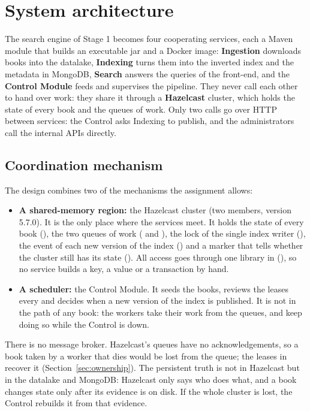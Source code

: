 \section{System architecture}
\label{sec:architecture}

The search engine of Stage 1 becomes four cooperating services, each a Maven module that builds an executable
jar and a Docker image: \textbf{Ingestion} downloads books into the datalake, \textbf{Indexing} turns them into
the inverted index and the metadata in MongoDB, \textbf{Search} answers the queries of the front-end, and the
\textbf{Control Module} feeds and supervises the pipeline. They never call each other to hand over work: they
share it through a \textbf{Hazelcast} cluster, which holds the state of every book and the queues of work. Only two
calls go over HTTP between services: the Control asks Indexing to publish, and the administrators call the
internal APIs directly.

\subsection{Coordination mechanism}

The design combines two of the mechanisms the assignment allows:

\begin{itemize}
  \item \textbf{A shared-memory region:} the Hazelcast cluster (two members, version 5.7.0). It is the only place
    where the services meet. It holds the state of every book (), the two queues of work
    ( and ), the lock of the single index writer (), the
    event of each new version of the index () and a marker that tells whether the cluster still
    has its state (). All access goes through one library in 
    (), so no service builds a key, a value or a transaction by hand.
  \item \textbf{A scheduler:} the Control Module. It seeds the books, reviews the leases every
     and decides when a new version of the index is published. It is not in the path of
    any book: the workers take their work from the queues, and keep doing so while the Control is down.
\end{itemize}

There is no message broker. Hazelcast's queues have no acknowledgements, so a book taken by a worker that dies would
be lost from the queue; the leases in  recover it (Section~\ref{sec:ownership}). The persistent
truth is not in Hazelcast but in the datalake and MongoDB: Hazelcast only says who does what, and a book changes state
only after its evidence is on disk. If the whole cluster is lost, the Control rebuilds it from that evidence.

